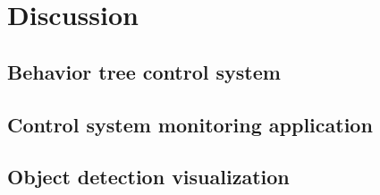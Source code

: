 \documentclass[\rootfolder/main.tex]{subfiles}
\begin{document}
\chapter{Discussion} %
\label{ch:discussion} %



\section{Behavior tree control system}



\section{Control system monitoring application}



\section{Object detection visualization}

\end{document}
